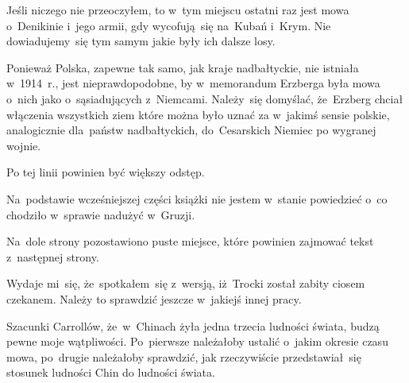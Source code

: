 \documentclass[a4paper,11pt]{article}
\begin{document}
\start {} Jeśli niczego nie przeoczyłem, to w~tym miejscu
ostatni raz jest mowa o~Denikinie i~jego armii, gdy wycofują~się
na~Kubań i~Krym. Nie dowiadujemy~się tym samym jakie były ich dalsze
losy.

\vspace{\spaceFour}



\start {} Ponieważ Polska, zapewne tak samo, jak kraje
nadbałtyckie, nie istniała w~1914~r., jest nieprawdopodobne, by
w~memorandum Erzberga była mowa o~nich jako o~sąsiadujących
z~Niemcami. Należy~się domyślać, że~Erzberg chciał włączenia
wszystkich ziem które można było uznać za w~jakimś sensie polskie,
analogicznie dla~państw nadbałtyckich, do~Cesarskich Niemiec po
wygranej wojnie.

\vspace{\spaceFour}



\start {} Po tej linii powinien być większy odstęp.

\vspace{\spaceFour}



\start {} Na~podstawie wcześniejszej części książki nie
jestem w~stanie powiedzieć o~co chodziło w~sprawie nadużyć w~Gruzji.

\vspace{\spaceFour}



\start {} Na~dole strony pozostawiono puste miejsce, które
powinien zajmować tekst z~następnej strony.

\vspace{\spaceFour}



\start {} Wydaje mi~się, że~spotkałem~się z~wersją,
iż~Trocki został zabity ciosem czekanem. Należy to sprawdzić jeszcze
w~jakiejś innej pracy.

\vspace{\spaceFour}



\start {} Szacunki Carrollów, że~w~Chinach żyła jedna
trzecia ludności świata, budzą pewne moje wątpliwości. Po~pierwsze
należałoby ustalić o~jakim okresie czasu mowa, po~drugie należałoby
sprawdzić, jak rzeczywiście przedstawiał~się stosunek ludności Chin do
ludności świata.

\vspace{\spaceFour}
\end{document}
